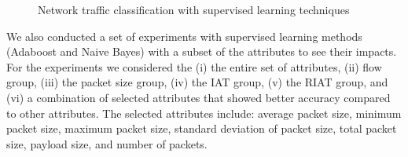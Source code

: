 \documentclass[conference]{IEEEtran}
\begin{document}

\begin{figure}[t]
 \centering
 \hspace{.3in}
 \caption{Network traffic classification with supervised learning techniques
 }
 \label{fig:supervised}
\end{figure}

We also conducted a set of experiments with supervised learning methods (Adaboost and Naive Bayes) with a subset of the attributes to see their impacts.
For the experiments %
we considered the (i) the entire set of attributes, (ii) flow group, (iii) the packet size group, (iv) the IAT group, (v) the RIAT group, and (vi) a combination of selected attributes that showed better accuracy compared to other attributes. The selected attributes include: average packet size, minimum packet size, maximum packet size, standard deviation of packet size, total packet size, payload size, and number of packets.
\end{document}
